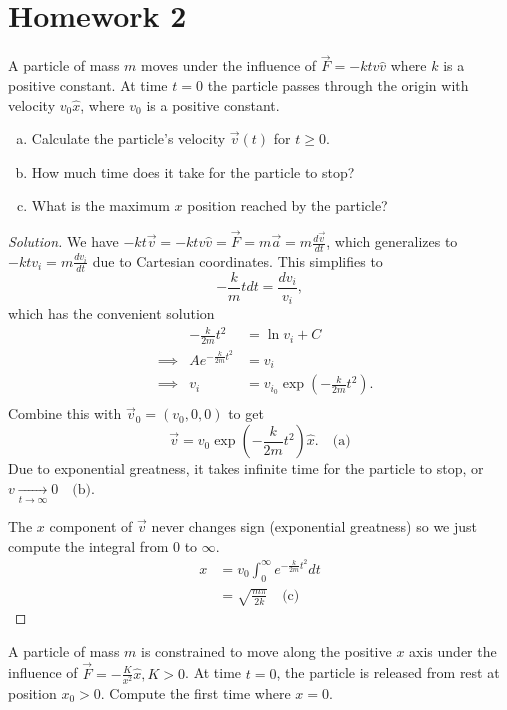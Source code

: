 \documentclass{article}
\begin{document}
\section{Homework 2}

\begin{prb}
A particle of mass $m$ moves under the influence of $\vec{F} = -ktv
\hat{v}$ where $k$ is a positive constant. At time $t = 0$ the particle
passes through the origin with velocity $v_0 \hat{x}$, where $v_0$ is a
positive constant.
\begin{enumerate}[(a)]
\item Calculate the particle's velocity $\vec{v}(t)$ for $t \geq 0$.
\item How much time does it take for the particle to stop?
\item What is the maximum $x$ position reached by the particle?
\end{enumerate}
\end{prb}

\begin{proof}[Solution]
We have $-kt\vec{v} = -ktv \hat{v} = \vec{F} = m\vec{a} = m \frac{d
\vec{v}}{dt}$, which generalizes to $-ktv_i = m \frac{dv_i}{dt}$ due to
Cartesian coordinates. This simplifies to
\[ -\frac{k}{m}tdt = \frac{dv_i}{v_i}, \]
which has the convenient solution
\[ \begin{aligned}
&& -\frac{k}{2m}t^2 &= \ln v_i + C \\
&\implies& Ae^{-\frac{k}{2m}t^2} &= v_i \\
&\implies& v_i &= v_{i_0} \exp\left(-\frac{k}{2m}t^2\right). \\
\end{aligned} \]
Combine this with $\vec{v}_0 = (v_0, 0, 0)$ to get
\[ \boxed{\vec{v} = v_0 \exp \left(-\frac{k}{2m}t^2\right) \hat{x}}.
\quad \textrm{(a)} \]
Due to exponential greatness, it takes infinite time for the particle to
stop, or $\boxed{v \xrightarrow[t \to \infty]{} 0} \quad \textrm{(b)}$.

The $x$ component of $\vec{v}$ never changes sign (exponential
greatness) so we just compute the integral from $0$ to $\infty$.
\[ \begin{aligned}
x &= v_0 \int_0^\infty e^{-\frac{k}{2m}t^2} dt \\
&= \boxed{\sqrt{\frac{m \pi}{2k}}} \quad \textrm{(c)}
\end{aligned} \]
\end{proof}

\begin{prb}
A particle of mass $m$ is constrained to move along the positive $x$
axis under the influence of $\vec{F} = -\frac{K}{x^2}\hat{x}, K > 0$. At
time $t = 0$, the particle is released from rest at position $x_0 > 0$.
Compute the first time where $x = 0$.
\end{prb}
\end{document}
